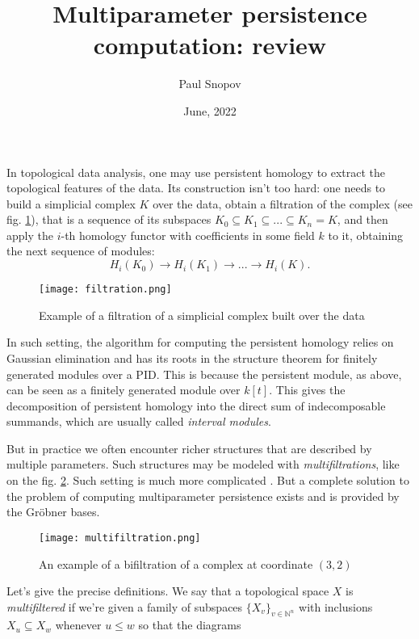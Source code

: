 \documentclass[a4paper,8pt,epsfig]{article}
\title{Multiparameter persistence computation: review}
\author{Paul Snopov}
\date{June, 2022}
\begin{document}
	\maketitle
	 In topological data analysis, one may use persistent homology to extract the topological features of the data. Its construction isn't too hard: one needs to build a simplicial complex $K$ over the data, obtain a filtration of the complex (see fig. \ref{fig:filtration}), that is a sequence of its subspaces $K_0 \subseteq K_1 \subseteq ... \subseteq K_n = K$, and then apply the $i$-th homology functor with coefficients in some field $k$ to it, obtaining the next sequence of modules:
	 \[
	 	H_i(K_0) \to H_i(K_1) \to ... \to H_i(K).
	 \]
	 
	 \begin{figure}
	 	\centering
	 	\texttt{[image: filtration.png]}
	 	\caption{Example of a filtration of a simplicial complex built over the data \cite{image1}}
	 	\label{fig:filtration}
	 \end{figure}
	 
	 In such setting, the algorithm for computing the persistent homology relies on Gaussian elimination and has its roots in the structure theorem for finitely generated modules over a PID. This is because the persistent module, as above, can be seen as a finitely generated module over $k[t]$. This gives the decomposition of persistent homology into the direct sum of indecomposable summands, which are usually called {\it interval modules}. 
	  
	 But in practice we often encounter richer structures that are described by multiple parameters. Such structures may be modeled with  {\it multifiltrations}, like on the fig. \ref{fig:multifiltration}. Such setting is much more complicated \cite{theormulpers}. But a complete solution to the problem of computing multiparameter persistence exists and is provided by the Gröbner bases.
	 
	 \begin{figure}
	 	\centering
	 	\texttt{[image: multifiltration.png]}
	 	\caption{An example of a bifiltration of a complex at coordinate $(3,2)$ \cite{image2}}
	 	\label{fig:multifiltration}
	 \end{figure}
	 
	 Let's give the precise definitions. We say that a topological space $X$ is {\it multifiltered} if we're given a family of subspaces $\{X_v\}_{v \in \mathbb{N}^n}$ with inclusions $X_u \subseteq X_w$ whenever $u \leq w$ so that the diagrams 
	 
\end{document}
